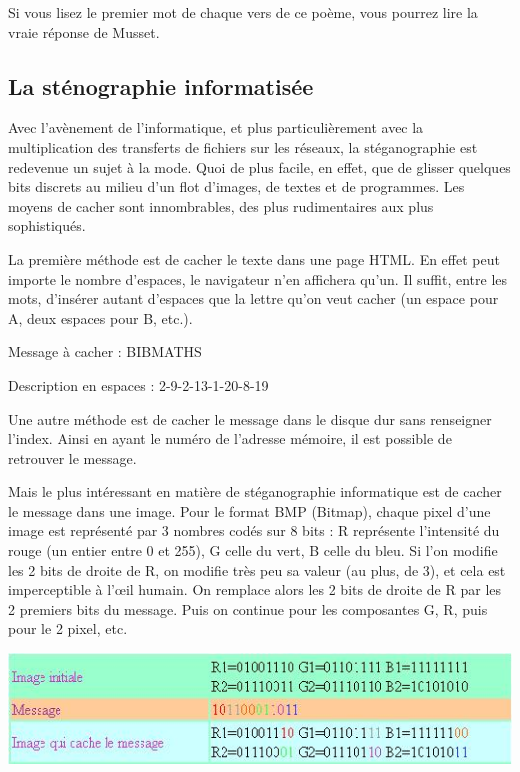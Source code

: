 \documentclass[a4paper,12pt]{article}
\begin{document}
Si vous lisez le premier mot de chaque vers de ce poème, vous pourrez lire la vraie réponse de Musset.

\subsection{La sténographie informatisée}

Avec l'avènement de l'informatique, et plus particulièrement avec la multiplication des transferts de fichiers sur les réseaux, la stéganographie est redevenue un sujet à la mode. Quoi de plus facile, en effet, que de glisser quelques bits discrets au milieu d'un flot d'images, de textes et de programmes. Les moyens de cacher sont innombrables, des plus rudimentaires aux plus sophistiqués.

La première méthode est de cacher le texte dans une page HTML. En effet peut importe le nombre d'espaces, le navigateur n'en affichera qu'un. Il suffit, entre les mots, d'insérer autant d'espaces que la lettre qu'on veut cacher (un espace pour A, deux espaces pour B, etc.).

Message à cacher : BIBMATHS

Description en espaces : 2-9-2-13-1-20-8-19

Une autre méthode est de cacher le message dans le disque dur sans renseigner l'index. Ainsi en ayant le numéro de l'adresse mémoire, il est possible de retrouver le message.

Mais le plus intéressant en matière de stéganographie informatique est de cacher le message dans une image. Pour le format BMP (Bitmap), chaque pixel d'une image est représenté par 3 nombres codés sur 8 bits : R représente l'intensité du rouge (un entier entre 0 et 255), G celle du vert, B celle du bleu. Si l'on modifie les 2 bits de droite de R, on modifie très peu sa valeur (au plus, de 3), et cela est imperceptible à l'\oe{}il humain. On remplace alors les 2 bits de droite de R par les 2 premiers bits du message. Puis on continue pour les composantes G, R, puis pour le 2\ieme{} pixel, etc.

\begin{center}
  \includegraphics[width=\textwidth]{../Image/cacher_bmp.JPG}
\end{center}
\end{document}
